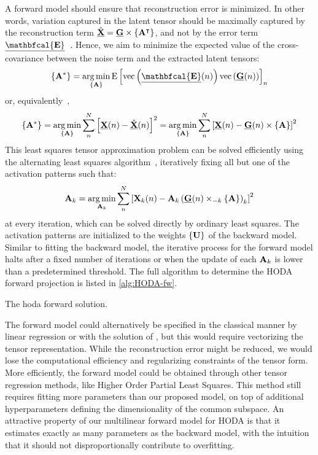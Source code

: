A forward model should ensure that reconstruction error is minimized.
In other words, variation captured in the latent tensor should be maximally captured by the
reconstruction term $\hat{\ten{X}}= \ten{G}\mmpr{\mat{A}^\intercal}$, and not by the error term
$\ten{\mathbfcal{E}}$~\cite{Haufe2014}.
Hence, we aim to minimize the expected value of the cross-covariance between
the noise term and the extracted latent tensors:
\begin{equation}
	\left\{\mat{A}^*\right\}
  = \argmin_{\{\mat{A}\}}\text{E}\left[
      \text{vec}\left(\ten{\mathbfcal{E}}(n)\right)\text{vec}\left(\ten{G}(n)\right)
    \right]_n
\end{equation}
or, equivalently~\cite{Parra2005,Haufe2014},
\begin{equation}
	\left\{\mat{A}^*\right\}
  = \argmin_{\{\mat{A}\}}\sum_n^N\left[\ten{X}(n) - \hat{\ten{X}}(n)\right]^2
  = \argmin_{\{\mat{A}\}}\sum_n^N\left[\ten{X}(n) - \ten{G}(n)\mmpr{\mat{A}}\right]^2
\end{equation}
This least squares tensor approximation problem can be solved efficiently using the
alternating least squares algorithm~\cite{Bentbib2022}, iteratively fixing all but one of the activation patterns such that:
\begin{equation}
	\mat{A}_k = \argmin_{\mat{A}_k}
	\sum_n^N\left[\mat{X}_k(n) -
		\mat{A}_k\left(\ten{G}(n)\mmprs{\mat{A}}{k}\right)_k\right]^2
\end{equation}
at every iteration, which can be solved directly by ordinary least squares.
The activation patterns are initialized to the weights $\{\mat{U}\}$ of the
backward model.
Similar to fitting the backward model, the iterative process for the forward
model halts after a fixed number of iterations or when the update of each
$\mat{A}_k$ is lower than a predetermined threshold.
The full algorithm to determine the HODA forward projection is listed
in \cref{alg:HODA-fw}.
\begin{algorithm}
  \caption[A \acs{hoda} forward solution.]{The \acs{hoda} forward solution.}
	\label{alg:HODA-fw}
	
\end{algorithm}

The forward model could alternatively be specified in the classical manner by linear
regression or with the solution of \textcite{Haufe2014}, but this would require
vectorizing the tensor representation.
While the reconstruction error might be reduced, we would lose the computational
efficiency and regularizing constraints of the tensor form.
More efficiently, the forward model could be obtained through other tensor
regression methods, like Higher Order Partial
Least Squares.
This method still requires fitting more parameters than our
proposed model, on top of additional hyperparameters defining the
dimensionality of the common subspace.
An attractive property of our multilinear forward model for HODA is that it
estimates exactly as many parameters as the backward model, with the intuition that
it should not disproportionally contribute to overfitting.

